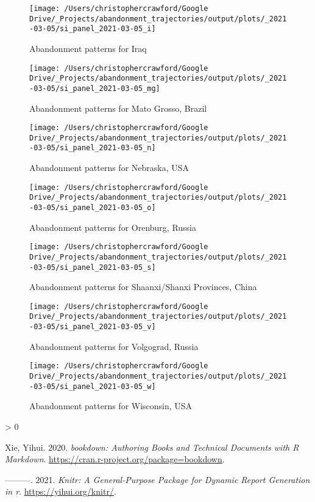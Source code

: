 \documentclass[
]{article}
\newlength{\cslhangindent}
\newenvironment{CSLReferences}[2] %
 {%
  \setlength{\parindent}{0pt}
  \ifodd #1 \everypar{\setlength{\hangindent}{\cslhangindent}}\ignorespaces\fi
  \ifnum #2 > 0
  \setlength{\parskip}{#2\baselineskip}
  \fi
 }%
 {}
\begin{document}
\begin{figure}
\texttt{[image: /Users/christophercrawford/Google Drive/\_Projects/abandonment\_trajectories/output/plots/\_2021-03-05/si\_panel\_2021-03-05\_i]} \caption{Abandonment patterns for Iraq}\label{fig:panel-i}
\end{figure}

\begin{figure}
\texttt{[image: /Users/christophercrawford/Google Drive/\_Projects/abandonment\_trajectories/output/plots/\_2021-03-05/si\_panel\_2021-03-05\_mg]} \caption{Abandonment patterns for Mato Grosso, Brazil}\label{fig:panel-mg}
\end{figure}

\begin{figure}
\texttt{[image: /Users/christophercrawford/Google Drive/\_Projects/abandonment\_trajectories/output/plots/\_2021-03-05/si\_panel\_2021-03-05\_n]} \caption{Abandonment patterns for Nebraska, USA}\label{fig:panel-n}
\end{figure}

\begin{figure}
\texttt{[image: /Users/christophercrawford/Google Drive/\_Projects/abandonment\_trajectories/output/plots/\_2021-03-05/si\_panel\_2021-03-05\_o]} \caption{Abandonment patterns for Orenburg, Russia}\label{fig:panel-o}
\end{figure}

\begin{figure}
\texttt{[image: /Users/christophercrawford/Google Drive/\_Projects/abandonment\_trajectories/output/plots/\_2021-03-05/si\_panel\_2021-03-05\_s]} \caption{Abandonment patterns for Shaanxi/Shanxi Provinces, China}\label{fig:panel-s}
\end{figure}

\begin{figure}
\texttt{[image: /Users/christophercrawford/Google Drive/\_Projects/abandonment\_trajectories/output/plots/\_2021-03-05/si\_panel\_2021-03-05\_v]} \caption{Abandonment patterns for Volgograd, Russia}\label{fig:panel-v}
\end{figure}

\begin{figure}
\texttt{[image: /Users/christophercrawford/Google Drive/\_Projects/abandonment\_trajectories/output/plots/\_2021-03-05/si\_panel\_2021-03-05\_w]} \caption{Abandonment patterns for Wisconsin, USA}\label{fig:panel-w}
\end{figure}

\hypertarget{refs}{}
\begin{CSLReferences}{1}{0}
\leavevmode\hypertarget{ref-R-bookdown}{}%
Xie, Yihui. 2020. \emph{{bookdown: Authoring Books and Technical Documents with R Markdown}}. \url{https://cran.r-project.org/package=bookdown}.

\leavevmode\hypertarget{ref-R-knitr}{}%
---------. 2021. \emph{Knitr: A General-Purpose Package for Dynamic Report Generation in r}. \url{https://yihui.org/knitr/}.

\end{CSLReferences}
\end{document}
